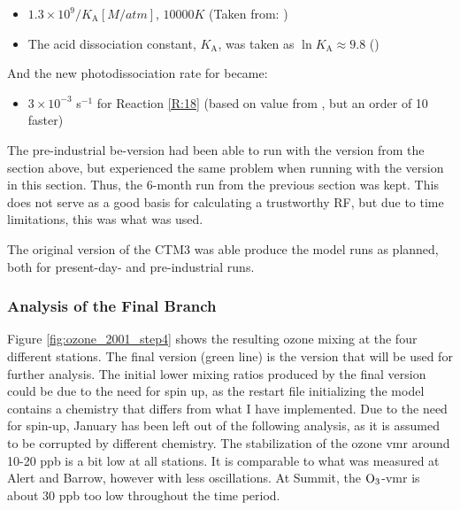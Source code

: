 \begin{itemize}
    \item $1.3\times10^9/K_\text{A} [M/atm]$, $10 000 K$ (Taken from: \cite{Brimblecombe1988TheSA})
    \item The acid dissociation constant, $K_\text{A}$, was taken as $\ln{K_\text{A}} \approx 9.8$ (\cite{Levanov})
\end{itemize}

And the new photodissociation rate for  became:

\begin{itemize}
    \item $3\times10^{-3}$ s$^{-1}$ for Reaction \ref{R:18} (based on value from \cite{CAO}, but an order of 10 faster)
\end{itemize}

The pre-industrial \acrshort{be}-version had been able to run with the version from the section above, but experienced the same problem when running with the version in this section. Thus, the 6-month run from the previous section was kept. This does not serve as a good basis for calculating a trustworthy RF, but due to time limitations, this was what was used. 

\medskip

The original version of the CTM3 was able produce the model runs as planned, both for present-day- and pre-industrial runs. 

\subsubsection{Analysis of the Final Branch}\label{sec:disc_finalBRanch}


Figure \ref{fig:ozone_2001_step4} shows the resulting ozone mixing at the four different stations. The final version (green line) is the version that will be used for further analysis. The initial lower mixing ratios produced by the final version could be due to the need for spin up, as the restart file initializing the model contains a chemistry that differs from what I have implemented. Due to the need for spin-up, January has been left out of the following analysis, as it is assumed to be corrupted by different chemistry. The stabilization of the ozone \acrshort{vmr} around 10-20 ppb is a bit low at all stations. It is comparable to what was measured at Alert and Barrow, however with less oscillations. At Summit, the $\mathrm{O_3}$-\acrshort{vmr} is about 30 ppb too low throughout the time period.


